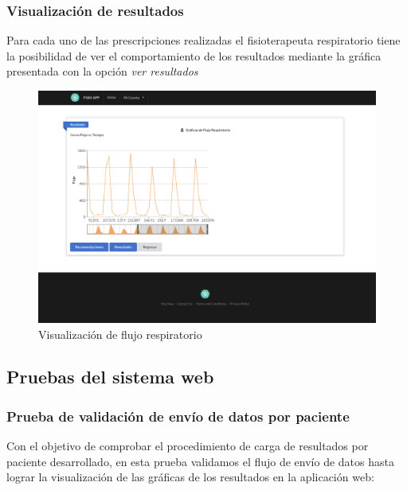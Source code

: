 \documentclass[12pt]{article}
\begin{document}
\subsubsection{Visualización de resultados}

Para cada uno de las prescripciones realizadas el fisioterapeuta respiratorio tiene la posibilidad de ver el comportamiento de los resultados mediante la gráfica presentada con la opción \textit{ver resultados}

\begin{figure}[ht]
\centering
\includegraphics[scale=0.3]{imag/appresultadosflujotiempo.png}
\caption{Visualización de flujo respiratorio}
\label{6}
\end{figure}
\FloatBarrier




 \subsection{Pruebas del sistema web}
 
\subsubsection{Prueba de validación de envío de datos por paciente }
Con el objetivo de comprobar el procedimiento de carga de resultados por paciente desarrollado, en esta prueba validamos el flujo de envío de datos hasta lograr la visualización de las gráficas de los resultados en la aplicación web:
\end{document}
